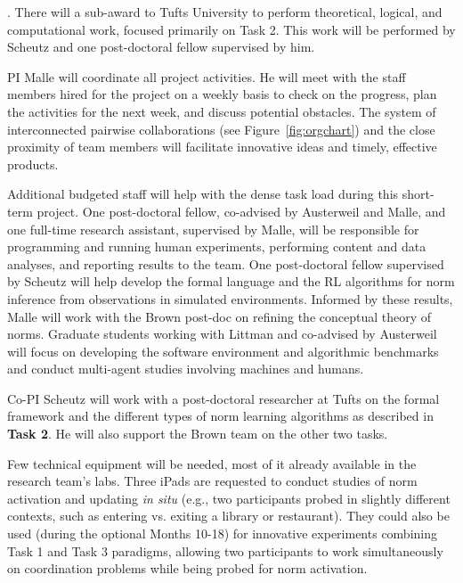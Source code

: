 \documentclass[12pt]{article}
\begin{document}
\vspace{1mm}
. There will a sub-award to Tufts University to perform theoretical,
logical, and computational work, focused primarily on Task 2.  This
work will be performed by Scheutz and one post-doctoral fellow
supervised by him.

\vspace{1mm}
 PI Malle will coordinate all project activities.  He will meet with
the staff members hired for the project on a weekly basis to
check on the progress, plan the activities for the next week, and
discuss potential obstacles.  The system of interconnected pairwise
collaborations (see Figure~\ref{fig:orgchart}) and the close proximity
of team members will facilitate innovative ideas and timely, effective
products.

Additional budgeted staff will help with the dense task load during
this short-term project.  One post-doctoral fellow, co-advised
by Austerweil and Malle, and one full-time research assistant,
supervised by Malle, will be responsible for programming and running
human experiments, performing content and data analyses, and reporting
results to the team.  One post-doctoral fellow supervised by Scheutz
will help develop the formal language and the RL algorithms for norm
inference from observations in simulated environments.  Informed by
these results, Malle will work with the Brown post-doc on refining the
conceptual theory of norms.  Graduate students working with Littman
and co-advised by Austerweil will focus on developing the software
environment and algorithmic benchmarks and conduct multi-agent studies
involving machines and humans.

Co-PI Scheutz will work with a post-doctoral researcher at Tufts on the
formal framework and the different types of norm learning algorithms
as described in {\bf Task 2}.  He will also support the Brown team on
the other two tasks.

\vspace{1mm}
 Few technical equipment will be needed, most of it already available
in the research team's labs.  Three iPads are requested to conduct
studies of norm activation and updating {\em in situ} (e.g., two
participants probed in slightly different contexts, such as entering
vs. exiting a library or restaurant).  They could also be used (during
the optional Months 10-18) for innovative experiments combining Task 1
and Task 3 paradigms, allowing two participants to work simultaneously
on coordination problems while being probed for norm activation.
\end{document}
